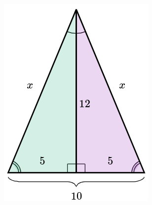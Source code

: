 \begin{solutionbox}{6.5cm}\footnotesize
    \begin{figure}
        \centering
        \captionsetup[figure]{size=footnotesize,justification=centering}
        \captionsetup[subfigure]{justification=centering}
        \caption{}
        \label{fig:pitagoras11}
        \begin{subfigure}{0.45\linewidth}
            \includegraphics[width=\linewidth]{../images/pitagoras11a.png}
            \caption{}
            \label{subfig:pitagoras11a}
        \end{subfigure}
        \begin{subfigure}{0.45\linewidth}

\end{subfigure}
\end{figure}
\end{solutionbox}
